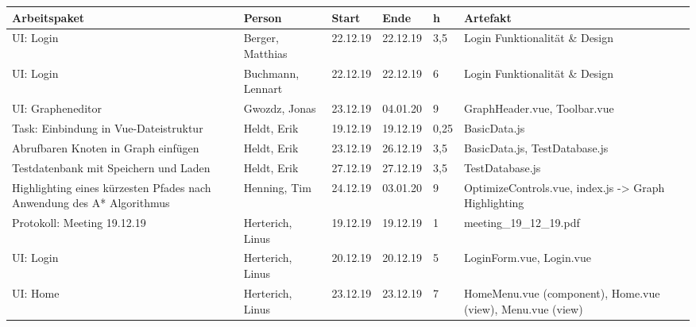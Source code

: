 \begin{longtable}{|p{4cm}|p{2cm}|p{1.2cm}|p{1.2cm}|p{0.7cm}|p{3.8cm}|}
  \hline
  Arbeitspaket                                                          & Person                & Start    & Ende     & h     & Artefakt                                                    \\
  \hline
  UI: Login                                                             & Berger, Matthias      & 22.12.19 & 22.12.19 & 3,5   & Login Funktionalität \& Design                              \\ \hline
  UI: Login                                                             & Buchmann, Lennart     & 22.12.19 & 22.12.19 & 6     & Login Funktionalität \& Design                              \\ \hline
  UI: Grapheneditor                                                     & Gwozdz, Jonas         & 23.12.19 & 04.01.20 & 9     & GraphHeader.vue, Toolbar.vue                                \\ \hline
  Task: Einbindung in Vue-Dateistruktur                                 & Heldt, Erik           & 19.12.19 & 19.12.19 & 0,25  & BasicData.js                                                \\ \hline
  Abrufbaren Knoten in Graph einfügen                                   & Heldt, Erik           & 23.12.19 & 26.12.19 & 3,5   & BasicData.js, TestDatabase.js                               \\ \hline
  Testdatenbank mit Speichern und Laden                                 & Heldt, Erik           & 27.12.19 & 27.12.19 & 3,5   & TestDatabase.js                                             \\ \hline
  Highlighting eines kürzesten Pfades nach Anwendung des A* Algorithmus & Henning, Tim          & 24.12.19 & 03.01.20 & 9     & OptimizeControls.vue, index.js -> Graph Highlighting        \\ \hline
  Protokoll: Meeting 19.12.19                                           & Herterich, Linus      & 19.12.19 & 19.12.19 & 1     & meeting\_19\_12\_19.pdf                                     \\ \hline
  UI: Login                                                             & Herterich, Linus      & 20.12.19 & 20.12.19 & 5     & LoginForm.vue, Login.vue                                    \\ \hline
  UI: Home                                                              & Herterich, Linus      & 23.12.19 & 23.12.19 & 7     & HomeMenu.vue (component), Home.vue (view), Menu.vue (view)  \\ \hline

\end{longtable}
